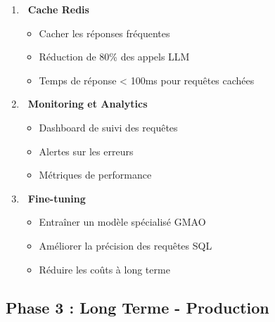 \documentclass[12pt,a4paper]{article}
\begin{document}
\begin{enumerate}[leftmargin=*]
    \item \textbf{\faMemory\ Cache Redis}
    \begin{itemize}
        \item Cacher les réponses fréquentes
        \item Réduction de 80\% des appels LLM
        \item Temps de réponse < 100ms pour requêtes cachées
    \end{itemize}
    
    \item \textbf{\faChartBar\ Monitoring et Analytics}
    \begin{itemize}
        \item Dashboard de suivi des requêtes
        \item Alertes sur les erreurs
        \item Métriques de performance
    \end{itemize}
    
    \item \textbf{\faGraduationCap\ Fine-tuning}
    \begin{itemize}
        \item Entraîner un modèle spécialisé GMAO
        \item Améliorer la précision des requêtes SQL
        \item Réduire les coûts à long terme
    \end{itemize}
\end{enumerate}

\subsection{Phase 3 : Long Terme - Production}
\end{document}
